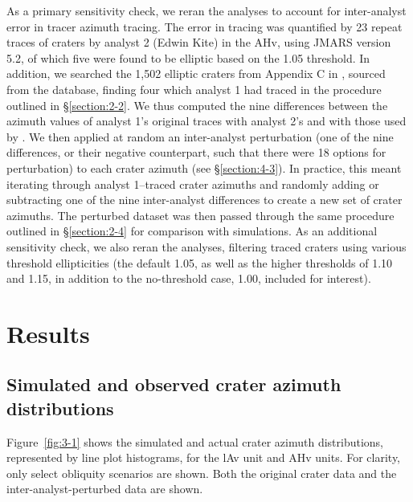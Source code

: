 \documentclass{ucetd}
\begin{document}
As a primary sensitivity check, we reran the analyses to account for inter-analyst error in tracer azimuth tracing. The error in tracing was quantified by 23 repeat traces of craters by analyst 2 (Edwin Kite) in the AHv, using JMARS version 5.2, of which five were found to be elliptic based on the 1.05 threshold. In addition, we searched the 1,502 elliptic craters from Appendix C in \citet{holo2018a}, sourced from the \citet{robbins2012a} database, finding four which analyst 1 had traced in the procedure outlined in §\ref{section:2-2}. We thus computed the nine differences between the azimuth values of analyst 1's original traces with analyst 2’s and with those used by \citet{holo2018a}. We then applied at random an inter-analyst perturbation (one of the nine differences, or their negative counterpart, such that there were 18 options for perturbation) to each crater azimuth (see §\ref{section:4-3}). In practice, this meant iterating through analyst 1--traced crater azimuths and randomly adding or subtracting one of the nine inter-analyst differences to create a new set of crater azimuths. The perturbed dataset was then passed through the same procedure outlined in §\ref{section:2-4} for comparison with simulations. As an additional sensitivity check, we also reran the analyses, filtering traced craters using various threshold ellipticities (the default 1.05, as well as the higher thresholds of 1.10 and 1.15, in addition to the no-threshold case, 1.00, included for interest).

\chapter{Results}
\label{chapter:3}

\section{Simulated and observed crater azimuth distributions}
\label{section:3-1}

Figure~\ref{fig:3-1} shows the simulated and actual crater azimuth distributions, represented by line plot histograms, for the lAv unit and AHv units. For clarity, only select obliquity scenarios are shown. Both the original crater data and the inter-analyst-perturbed data are shown.
\end{document}
